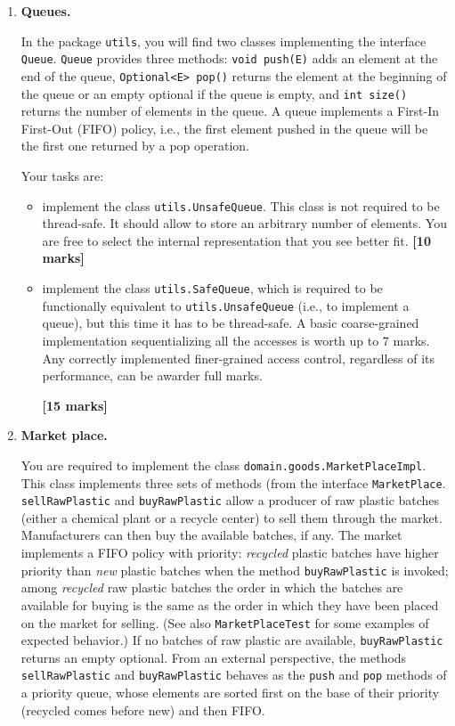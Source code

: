 \documentclass[a4wide,11pt]{article}
\renewcommand{\j}[1]{\texttt{#1}}
\begin{document}
\begin{enumerate}
	\item \textbf{Queues.}

	In the package \j{utils}, you will find two classes implementing the interface
\j{Queue}. \j{Queue} provides three methods: \j{void push(E)} adds an element
at the end of the queue, \j{Optional<E> pop()} returns the element at the
beginning of the queue or an empty optional if the queue is empty, and \j{int
size()} returns the number of elements in the queue. A queue implements a
First-In First-Out (FIFO) policy, i.e., the first element pushed in the queue
will be the first one returned by a pop operation. 

Your tasks are:
	\begin{itemize}
		\item implement the class \j{utils.UnsafeQueue}. This class is
not required to be thread-safe. It should allow to store an arbitrary number of
elements. You are free to select the internal representation that you see
better fit. \textbf{[10 marks]}
		\item implement the class \j{utils.SafeQueue}, which is required to be
functionally equivalent to \j{utils.UnsafeQueue} (i.e., to implement a queue),
but this time it has to be thread-safe. A basic coarse-grained implementation
sequentializing all the accesses is worth up to 7 marks. Any
correctly implemented finer-grained
access control, regardless of its performance, can be awarder full marks.

\textbf{[15 marks]}
	\end{itemize}

\item \textbf{Market place.}

You are required to implement the class \j{domain.goods.MarketPlaceImpl}. This
class implements three sets of methods (from the interface \j{MarketPlace}.
\j{sellRawPlastic} and \j{buyRawPlastic} allow a producer of raw plastic
batches
(either a chemical plant or a recycle center) to sell them
through the market. Manufacturers can then buy the available batches, if any.
The market implements a FIFO policy with priority: \emph{recycled} plastic
batches have higher priority than \emph{new} plastic batches when the method
\j{buyRawPlastic} is invoked; among \emph{recycled} raw plastic batches the
order in which the batches are available for buying is the same as the order in
which they have been placed on the market for selling. (See also
\j{MarketPlaceTest} for some examples of expected behavior.) If no batches of
raw plastic are available, \j{buyRawPlastic} returns an empty optional. From an
external perspective, the methods \j{sellRawPlastic} and \j{buyRawPlastic}
behaves as the \j{push} and \j{pop} methods of a priority queue, whose elements
are sorted first on the base of their priority (recycled comes before new) and
then FIFO.


\end{enumerate}
\end{document}
